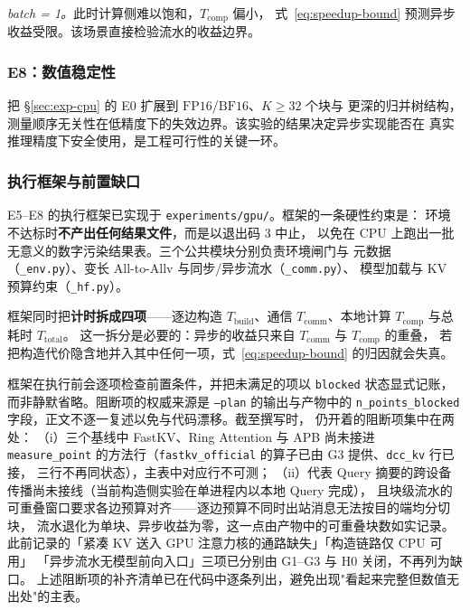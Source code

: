\emph{batch = 1。}此时计算侧难以饱和，$T_{\text{comp}}$ 偏小，
式~\eqref{eq:speedup-bound} 预测异步收益受限。该场景直接检验流水的收益边界。

\subsubsection{E8：数值稳定性}

把 \S\ref{sec:exp-cpu} 的 E0 扩展到 $\mathrm{FP16}$/$\mathrm{BF16}$、$K \ge 32$ 个块与
更深的归并树结构，测量顺序无关性在低精度下的失效边界。该实验的结果决定异步实现能否在
真实推理精度下安全使用，是工程可行性的关键一环。

\subsubsection{执行框架与前置缺口}
\label{sec:exp-gpu-frame}

E5--E8 的执行框架已实现于 \texttt{experiments/gpu/}。框架的一条硬性约束是：
环境不达标时\textbf{不产出任何结果文件}，而是以退出码 $3$ 中止，
以免在 CPU 上跑出一批无意义的数字污染结果表。三个公共模块分别负责环境闸门与
元数据（\texttt{\_env.py}）、变长 All-to-Allv 与同步/异步流水（\texttt{\_comm.py}）、
模型加载与 KV 预算约束（\texttt{\_hf.py}）。

框架同时把\textbf{计时拆成四项}——逐边构造 $T_{\text{build}}$、通信
$T_{\text{comm}}$、本地计算 $T_{\text{comp}}$ 与总耗时 $T_{\text{total}}$。
这一拆分是必要的：异步的收益只来自 $T_{\text{comm}}$ 与 $T_{\text{comp}}$ 的重叠，
若把构造代价隐含地并入其中任何一项，式~\eqref{eq:speedup-bound} 的归因就会失真。

框架在执行前会逐项检查前置条件，并把未满足的项以 \texttt{blocked} 状态显式记账，
而非静默省略。阻断项的权威来源是 \texttt{--plan} 的输出与产物中的
\texttt{n\_points\_blocked} 字段，正文不逐一复述以免与代码漂移。截至撰写时，
仍开着的阻断项集中在两处：
（i）三个基线中 FastKV、Ring Attention 与 APB 尚未接进 \texttt{measure\_point}
的方法行（\texttt{fastkv\_official} 的算子已由 G3 提供、\texttt{dcc\_kv} 行已接，
三行不再同状态），主表中对应行不可测；
（ii）代表 Query 摘要的跨设备传播尚未接线（当前构造侧实验在单进程内以本地 Query 完成），
且块级流水的可重叠窗口要求各边预算对齐——逐边预算不同时出站消息无法按目的端均分切块，
流水退化为单块、异步收益为零，这一点由产物中的可重叠块数如实记录。
此前记录的「紧凑 KV 送入 GPU 注意力核的通路缺失」「构造链路仅 CPU 可用」
「异步流水无模型前向入口」三项已分别由 G1--G3 与 H0 关闭，不再列为缺口。
上述阻断项的补齐清单已在代码中逐条列出，避免出现"看起来完整但数值无出处"的主表。

